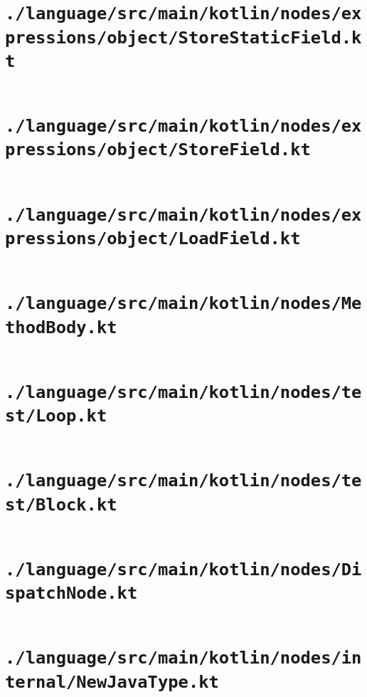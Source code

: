 \documentclass[a4paper, 11pt]{report}
\begin{document}
    \section{\lstinline{./language/src/main/kotlin/nodes/expressions/object/StoreStaticField.kt}}
    \inputminted{kotlin}{./language/src/main/kotlin/nodes/expressions/object/StoreStaticField.kt}


    \section{\lstinline{./language/src/main/kotlin/nodes/expressions/object/StoreField.kt}}
    \inputminted{kotlin}{./language/src/main/kotlin/nodes/expressions/object/StoreField.kt}


    \section{\lstinline{./language/src/main/kotlin/nodes/expressions/object/LoadField.kt}}
    \inputminted{kotlin}{./language/src/main/kotlin/nodes/expressions/object/LoadField.kt}


    \section{\lstinline{./language/src/main/kotlin/nodes/MethodBody.kt}}
    \inputminted{kotlin}{./language/src/main/kotlin/nodes/MethodBody.kt}


    \section{\lstinline{./language/src/main/kotlin/nodes/test/Loop.kt}}
    \inputminted{kotlin}{./language/src/main/kotlin/nodes/test/Loop.kt}


    \section{\lstinline{./language/src/main/kotlin/nodes/test/Block.kt}}
    \inputminted{kotlin}{./language/src/main/kotlin/nodes/test/Block.kt}


    \section{\lstinline{./language/src/main/kotlin/nodes/DispatchNode.kt}}
    \inputminted{kotlin}{./language/src/main/kotlin/nodes/DispatchNode.kt}


    \section{\lstinline{./language/src/main/kotlin/nodes/internal/NewJavaType.kt}}
    \inputminted{kotlin}{./language/src/main/kotlin/nodes/internal/NewJavaType.kt}
\end{document}
